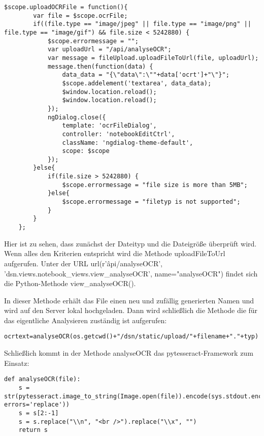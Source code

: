 \begin{lstlisting}[caption={Upload OCR-File}]
$scope.uploadOCRFile = function(){
        var file = $scope.ocrFile;
        if((file.type == "image/jpeg" || file.type == "image/png" || 				file.type == "image/gif") && file.size < 5242880) {
            $scope.errormessage = "";
            var uploadUrl = "/api/analyseOCR";
            var message = fileUpload.uploadFileToUrl(file, uploadUrl);
            message.then(function(data) {
                data_data = "{\"data\":\""+data['ocrt']+"\"}";
                $scope.addelement('textarea', data_data);
                $window.location.reload();
                $window.location.reload();
            });
            ngDialog.close({
                template: 'ocrFileDialog',
                controller: 'notebookEditCtrl',
                className: 'ngdialog-theme-default',
                scope: $scope
            });
        }else{
            if(file.size > 5242880) {
                $scope.errormessage = "file size is more than 5MB";
            }else{
                $scope.errormessage = "filetyp is not supported";
            }
        }
    };
\end{lstlisting}

Hier ist zu sehen, dass zunächst der Dateityp und die Dateigröße überprüft wird. Wenn alles den Kriterien entspricht wird die Methode uploadFileToUrl aufgerufen. Unter der URL url(r'\^api/analyseOCR', 'dsn.views.notebook\_views.view\_analyseOCR', name="analyseOCR") findet sich die Python-Methode view\_analyseOCR().

In dieser Methode erhält das File einen neu und zufällig generierten Namen und wird auf den Server lokal hochgeladen. Dann wird schließlich die Methode die für das eigentliche Analysieren zuständig ist aufgerufen:

\begin{lstlisting}[caption={OCR-Analyse}]
ocrtext=analyseOCR(os.getcwd()+"/dsn/static/upload/"+filename+"."+typ)
\end{lstlisting}

Schließlich kommt in der Methode analyseOCR das pytesseract-Framework zum Einsatz:

\begin{lstlisting}[caption={analyseOCR mittels pytesseract}]
def analyseOCR(file):
	s = 						 str(pytesseract.image_to_string(Image.open(file)).encode(sys.stdout.encoding, 	errors='replace'))
    s = s[2:-1]
    s = s.replace("\\n", "<br />").replace("\\x", "")
    return s
\end{lstlisting}

